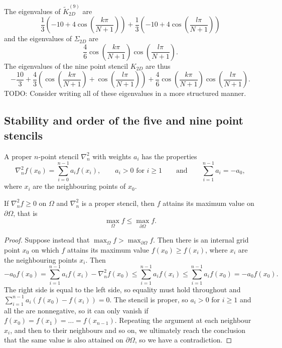 The eigenvalues of $\tilde{K}_{2D}^{(9)}$ are
$$
\frac13\left(-10 + 4\cos\left(\frac{k \pi}{N + 1}\right)\right)
+
\frac13\left(-10 + 4\cos\left(\frac{l \pi}{N + 1}\right)\right)
$$
and the eigenvalues of $\Sigma_{2D}$ are
$$
\frac46
\cos\left(\frac{k \pi}{N+1}\right)
\cos\left(\frac{l \pi}{N+1}\right).
$$
The eigenvalues of the nine point stencil $K_{2D}$ are thus
\begin{equation}
  -\frac{10}{3}
  + \frac43
  \left(
  \cos(\frac{k \pi}{N+1})
  + \cos(\frac{l \pi}{N+1})
  \right)
  +
  \frac46
  \cos(\frac{k \pi}{N+1})
  \cos(\frac{l \pi}{N+1}).
\end{equation}
TODO: Consider writing all of these eigenvalues in a more structured manner.

\newcommand{\inorm}[1]{
\lVert #1 \rVert_\infty
}

\subsection{Stability and order of the five and nine point stencils}
\begin{definition}
  A proper $n$-point stencil $\nabla_n^2$ with weights $a_i$ has the properties
  \begin{equation*}
  	\nabla_n^2 f(x_0) = \sum_{i=0}^{n-1} a_i f(x_i),
	\qquad 
	a_i > 0 \,\, \text{for} \,\, i \geq 1
	\qquad \text{and} \qquad
	\sum_{i=1}^{n-1} a_i = -a_0,
  \end{equation*}
  where $x_i$ are the neighbouring points of $x_0$.
\end{definition}

\begin{lemma}\label{pde:lemma:max}
If $\nabla_n^2 f \geq 0$ on $\Omega$ and $\nabla_n^2$ is a proper stencil, then $f$ attains its maximum value on $\partial \Omega$, that is
$$
\max_\Omega f  \leq \max_{\partial \Omega} f.
$$
\end{lemma}
\begin{proof}
Suppose instead that $\max_\Omega f > \max_{\partial \Omega} f$.
Then there is an internal grid point $x_0$ on which $f$ attains its maximum value $f(x_0) \geq f(x_i)$, where $x_i$ are the neighbouring points $x_i$.
Then
\begin{equation}
  -a_0 f(x_0)
  = \sum_{i=1}^{n-1} a_i f(x_i) - \nabla_n^2 f(x_0)
  \leq \sum_{i=1}^{n-1} a_i f(x_i)
  \leq \sum_{i=1}^{n-1} a_i f(x_0)
  = -a_0 f(x_0).
\end{equation}
The right side is equal to the left side, so equality must hold throughout and $\sum_{i=1}^{n-1} a_i (f(x_0) - f(x_i)) = 0$.
The stencil is proper, so $a_i > 0$ for $i \geq 1$ and all the are nonnegative, so it can only vanish if $f(x_0) = f(x_1) = \dots = f(x_{n-1})$.
Repeating the argument at each neighbour $x_i$, and then to their neighbours and so on, we ultimately reach the conclusion that the same value is also attained on $\partial \Omega$, so we have a contradiction.
\end{proof}

